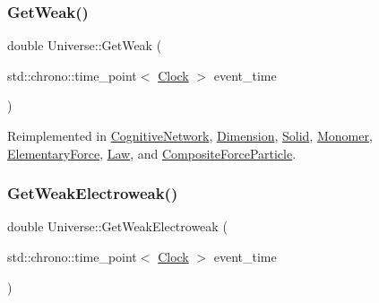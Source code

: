 \mbox{\label{classUniverse_a4476b7e0a3fc1764909f556257fd9ec7}} 
\subsubsection{\texorpdfstring{Get\+Weak()}{GetWeak()}}
{\footnotesize\ttfamily double Universe\+::\+Get\+Weak (\begin{DoxyParamCaption}\item[{std\+::chrono\+::time\+\_\+point$<$ \mbox{\hyperlink{universe_8h_a0ef8d951d1ca5ab3cfaf7ab4c7a6fd80}{Clock}} $>$}]{event\+\_\+time }\end{DoxyParamCaption})\hspace{0.3cm}{\ttfamily [virtual]}}



Reimplemented in \mbox{\hyperlink{classCognitiveNetwork_a761db75ac8eab7b4625e5a398891bd12}{Cognitive\+Network}}, \mbox{\hyperlink{classDimension_a656ce92d07ea600cc0ec53865ad515e2}{Dimension}}, \mbox{\hyperlink{classSolid_ac8a7738735a6bda4e89414a2b0c370e1}{Solid}}, \mbox{\hyperlink{classMonomer_ac2070d7e39cd0b2a00aa6023ffd51f55}{Monomer}}, \mbox{\hyperlink{classElementaryForce_a4669f2ce414e508c70ae4ce0df503ad1}{Elementary\+Force}}, \mbox{\hyperlink{classLaw_a303c365b7a17997a63a74756fc72fba3}{Law}}, and \mbox{\hyperlink{classCompositeForceParticle_ab5cc0893a4063cc353ea5d2404f27b0b}{Composite\+Force\+Particle}}.

\mbox{\label{classUniverse_a645299738e6b798a037f2a15a2e7cf4d}} 
\subsubsection{\texorpdfstring{Get\+Weak\+Electroweak()}{GetWeakElectroweak()}}
{\footnotesize\ttfamily double Universe\+::\+Get\+Weak\+Electroweak (\begin{DoxyParamCaption}\item[{std\+::chrono\+::time\+\_\+point$<$ \mbox{\hyperlink{universe_8h_a0ef8d951d1ca5ab3cfaf7ab4c7a6fd80}{Clock}} $>$}]{event\+\_\+time }\end{DoxyParamCaption})\hspace{0.3cm}{\ttfamily [virtual]}}



